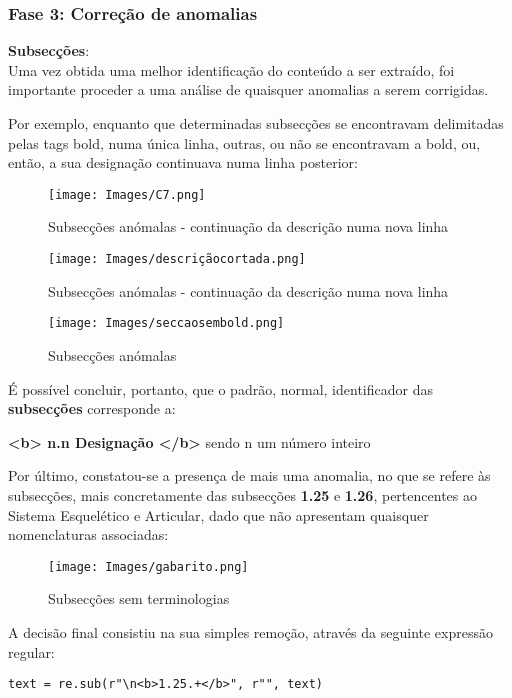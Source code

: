 \subsubsection{Fase 3: Correção de anomalias}
\textbf{Subsecções}:\\
Uma vez obtida uma melhor identificação do conteúdo a ser extraído, foi importante proceder a uma análise de quaisquer anomalias a serem corrigidas.

Por exemplo, enquanto que determinadas subsecções se encontravam delimitadas pelas tags bold, numa única linha, outras, ou não se encontravam a bold, ou, então, a sua designação continuava numa linha posterior:

\begin{figure}[H]
    \centering
    \centering
    \texttt{[image: Images/C7.png]}
    \caption{Subsecções anómalas - continuação da descrição numa nova linha}
    \label{fig:c7}
\end{figure}

\begin{figure}[H]
    \centering
    \centering
    \texttt{[image: Images/descriçãocortada.png]}
    \caption{Subsecções anómalas - continuação da descrição numa nova linha}
    \label{fig:desccortada}
\end{figure}

\begin{figure}[H]
    \centering
    \centering
    \texttt{[image: Images/seccaosembold.png]}
    \caption{Subsecções anómalas}
    \label{fig:sembold}
\end{figure}

É possível concluir, portanto, que o padrão, normal, identificador das \textbf{subsecções} corresponde a:
\begin{center}
    \textbf{<b> n.n Designação </b>} sendo n um número inteiro
\end{center}

Por último, constatou-se a presença de mais uma anomalia, no que se refere às subsecções, mais concretamente das subsecções \textbf{1.25} e \textbf{1.26}, pertencentes ao Sistema Esquelético e Articular, dado que não apresentam quaisquer nomenclaturas associadas:

\begin{figure}[H]
    \centering
    \centering
    \texttt{[image: Images/gabarito.png]}
    \caption{Subsecções sem terminologias}
    \label{fig:sembold}
\end{figure}
A decisão final consistiu na sua simples remoção, através da seguinte expressão regular:
\begin{lstlisting}[style=pythonstyle]
text = re.sub(r"\n<b>1.25.+</b>", r"", text)
\end{lstlisting}

